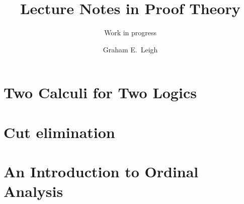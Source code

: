 \documentclass[%
	paper=174mm:247mm,
	DIV=11,
	leqno,
	titlepage,
	headsepline,
	headsepline=false,
	dynindent,
	dynnumwidth,
	toc=bib,
	toc=sectionentrywithoutdots,
	toc=chapterentrywithoutdots,
	unicode
	]%
	{scrbook}
\title{Lecture Notes in Proof Theory}
\subtitle{Work in progress}
\author{Graham E.\ Leigh}
\begin{document}
\frontmatter
\maketitle



\tableofcontents

\mainmatter


\part{Two Calculi for Two Logics}
\label{module-1}



\part{Cut elimination}
\label{module-2}





\part{An Introduction to Ordinal Analysis}
\label{module-3}





%
%
%

\backmatter



\end{document}
